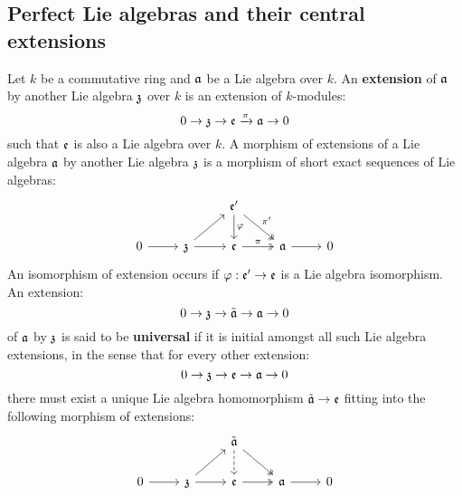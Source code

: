     \subsection{Perfect Lie algebras and their central extensions}
        \begin{definition}
            Let $k$ be a commutative ring and $\mathfrak{a}$ be a Lie algebra over $k$. An \textbf{extension} of $\mathfrak{a}$ by another Lie algebra $\mathfrak{z}$ over $k$ is an extension of $k$-modules:
                $$0 \to \mathfrak{z} \to \mathfrak{e} \xrightarrow[]{\pi} \mathfrak{a} \to 0$$
            such that $\mathfrak{e}$ is also a Lie algebra over $k$. A morphism of extensions of a Lie algebra $\mathfrak{a}$ by another Lie algebra $\mathfrak{z}$ is a morphism of short exact sequences of Lie algebras:
                $$
                    \begin{tikzcd}
                	&& {\frake'} \\
                	0 & \z & \frake & \a & 0
                	\arrow["\varphi", from=1-3, to=2-3]
                	\arrow["{\pi'}", two heads, from=1-3, to=2-4]
                	\arrow["\pi", two heads, from=2-3, to=2-4]
                	\arrow[from=2-2, to=2-3]
                	\arrow[from=2-2, to=1-3]
                	\arrow[from=2-1, to=2-2]
                	\arrow[from=2-4, to=2-5]
                    \end{tikzcd}
                $$
            An isomorphism of extension occurs if $\varphi: \mathfrak{e}' \to \mathfrak{e}$ is a Lie algebra isomorphism. An extension:
                $$0 \to \mathfrak{z} \to \tilde{\mathfrak{a}} \to \mathfrak{a} \to 0$$
            of $\mathfrak{a}$ by $\mathfrak{z}$ is said to be \textbf{universal} if it is initial amongst all such Lie algebra extensions, in the sense that for every other extension:
                $$0 \to \mathfrak{z} \to \mathfrak{e} \to \mathfrak{a} \to 0$$
            there must exist a unique Lie algebra homomorphism $\tilde{\mathfrak{a}} \to \mathfrak{e}$ fitting into the following morphism of extensions:
                $$
                    \begin{tikzcd}
                	&& {\tilde{\a}} \\
                	0 & \z & \frake & \a & 0
                	\arrow[dashed, from=1-3, to=2-3]
                	\arrow[two heads, from=1-3, to=2-4]
                	\arrow[two heads, from=2-3, to=2-4]
                	\arrow[from=2-2, to=2-3]
                	\arrow[from=2-2, to=1-3]
                	\arrow[from=2-1, to=2-2]
                	\arrow[from=2-4, to=2-5]
                    \end{tikzcd}
                $$
        \end{definition}
